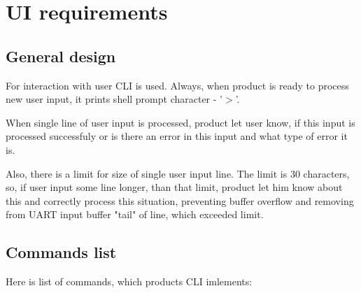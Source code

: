 \chapter*{UI requirements}

\section*{General design}

For interaction with user CLI is used. Always, when product is ready to process new user input, it prints shell prompt character - '$>$'.

When single line of user input is processed, product let user know, if this input is processed successfuly or is there an error in this input and what type of error it is.

Also, there is a limit for size of single user input line. The limit is 30 characters, so, if user input some line longer, than that limit, product let him know about this and correctly process this situation, preventing buffer overflow and removing from UART input buffer "tail" of line, which exceeded limit.

\section*{Commands list}

Here is list of commands, which products CLI imlements:


